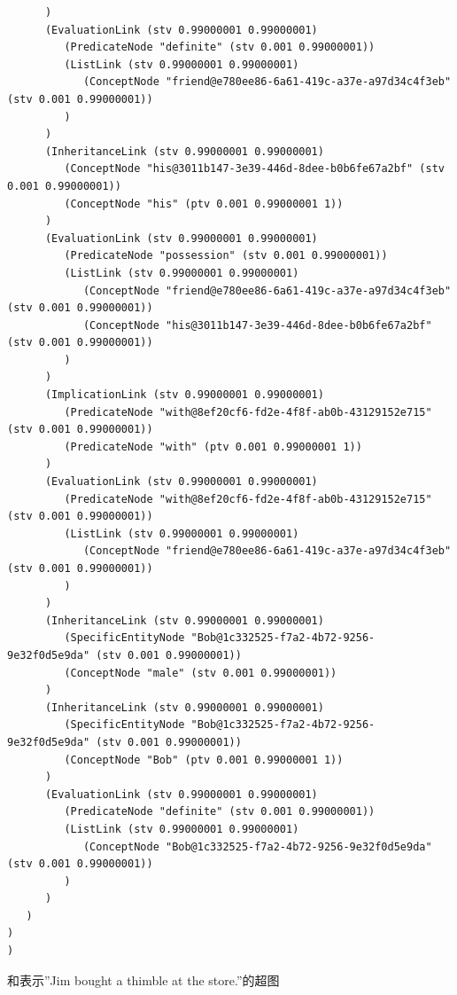 {\begin{tiny}
\begin{lstlisting}
      )
      (EvaluationLink (stv 0.99000001 0.99000001)
         (PredicateNode "definite" (stv 0.001 0.99000001))
         (ListLink (stv 0.99000001 0.99000001)
            (ConceptNode "friend@e780ee86-6a61-419c-a37e-a97d34c4f3eb" (stv 0.001 0.99000001))
         )
      )
      (InheritanceLink (stv 0.99000001 0.99000001)
         (ConceptNode "his@3011b147-3e39-446d-8dee-b0b6fe67a2bf" (stv 0.001 0.99000001))
         (ConceptNode "his" (ptv 0.001 0.99000001 1))
      )
      (EvaluationLink (stv 0.99000001 0.99000001)
         (PredicateNode "possession" (stv 0.001 0.99000001))
         (ListLink (stv 0.99000001 0.99000001)
            (ConceptNode "friend@e780ee86-6a61-419c-a37e-a97d34c4f3eb" (stv 0.001 0.99000001))
            (ConceptNode "his@3011b147-3e39-446d-8dee-b0b6fe67a2bf" (stv 0.001 0.99000001))
         )
      )
      (ImplicationLink (stv 0.99000001 0.99000001)
         (PredicateNode "with@8ef20cf6-fd2e-4f8f-ab0b-43129152e715" (stv 0.001 0.99000001))
         (PredicateNode "with" (ptv 0.001 0.99000001 1))
      )
      (EvaluationLink (stv 0.99000001 0.99000001)
         (PredicateNode "with@8ef20cf6-fd2e-4f8f-ab0b-43129152e715" (stv 0.001 0.99000001))
         (ListLink (stv 0.99000001 0.99000001)
            (ConceptNode "friend@e780ee86-6a61-419c-a37e-a97d34c4f3eb" (stv 0.001 0.99000001))
         )
      )
      (InheritanceLink (stv 0.99000001 0.99000001)
         (SpecificEntityNode "Bob@1c332525-f7a2-4b72-9256-9e32f0d5e9da" (stv 0.001 0.99000001))
         (ConceptNode "male" (stv 0.001 0.99000001))
      )
      (InheritanceLink (stv 0.99000001 0.99000001)
         (SpecificEntityNode "Bob@1c332525-f7a2-4b72-9256-9e32f0d5e9da" (stv 0.001 0.99000001))
         (ConceptNode "Bob" (ptv 0.001 0.99000001 1))
      )
      (EvaluationLink (stv 0.99000001 0.99000001)
         (PredicateNode "definite" (stv 0.001 0.99000001))
         (ListLink (stv 0.99000001 0.99000001)
            (ConceptNode "Bob@1c332525-f7a2-4b72-9256-9e32f0d5e9da" (stv 0.001 0.99000001))
         )
      )
   )
)
)

\end{lstlisting}\end{tiny}}

和表示”Jim bought a thimble at the store.”的超图

